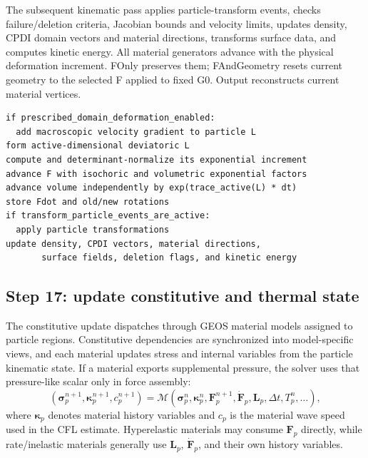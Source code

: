 The subsequent kinematic pass applies particle-transform events, checks failure/deletion criteria, Jacobian bounds and velocity limits, updates density, CPDI domain vectors and material directions, transforms surface data, and computes kinetic energy. All material generators advance with the physical deformation increment. FOnly preserves them; FAndGeometry resets current geometry to the selected F applied to fixed G0. Output reconstructs current material vertices.

\begin{lstlisting}[caption={Particle kinematic update.},basicstyle=\ttfamily\small]
if prescribed_domain_deformation_enabled:
  add macroscopic velocity gradient to particle L
form active-dimensional deviatoric L
compute and determinant-normalize its exponential increment
advance F with isochoric and volumetric exponential factors
advance volume independently by exp(trace_active(L) * dt)
store Fdot and old/new rotations
if transform_particle_events_are_active:
  apply particle transformations
update density, CPDI vectors, material directions,
       surface fields, deletion flags, and kinetic energy
\end{lstlisting}

\subsection{Step 17: update constitutive and thermal state}
\label{subsec:solver-step-17}
The constitutive update dispatches through GEOS material models assigned to particle regions.  Constitutive dependencies are synchronized into model-specific views, and each material updates stress and internal variables from the particle kinematic state.  If a material exports supplemental pressure, the solver uses that pressure-like scalar only in force assembly:
\begin{equation}
  \left(\boldsymbol{\sigma}_p^{n+1},\boldsymbol{\kappa}_p^{n+1},c_p^{n+1}\right)
  = \mathcal{M}\left(\boldsymbol{\sigma}_p^{n},\boldsymbol{\kappa}_p^{n},\mathbf{F}_p^{n+1},\dot{\mathbf{F}}_p,\mathbf{L}_p,\Delta t,T_p^n,\ldots\right),
\end{equation}
where $\boldsymbol{\kappa}_p$ denotes material history variables and $c_p$ is the material wave speed used in the CFL estimate.  Hyperelastic materials may consume $\mathbf{F}_p$ directly, while rate/inelastic materials generally use $\mathbf{L}_p$, $\dot{\mathbf{F}}_p$, and their own history variables.


